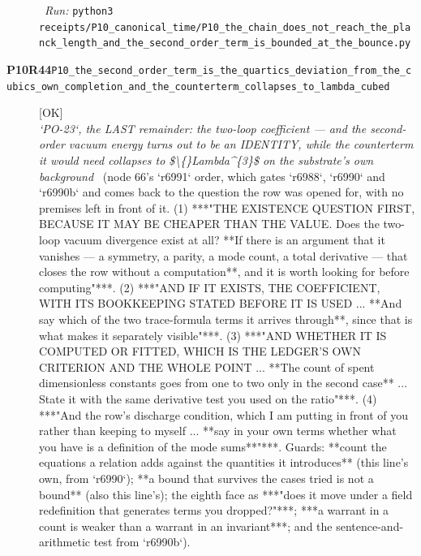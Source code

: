 \begin{description}
\ \emph{Run:} \texttt{python3 receipts/P10\_canonical\_time/P10\_the\_chain\_does\_not\_reach\_the\_planck\_length\_and\_the\_second\_order\_term\_is\_bounded\_at\_the\_bounce.py}
\item[\rcptlabel{P10_the_second_order_term_is_the_quartics_deviation_from_the_cubics_own_completion_and_the_counterterm_collapses_to_lambda_cubed}{P10R44}\textbf{P10R44}\quad\texttt{P10\_the\_second\_order\_term\_is\_the\_quartics\_deviation\_from\_the\_cubics\_own\_completion\_and\_the\_counterterm\_collapses\_to\_lambda\_cubed}]\hfill\textsf{[OK]}\\
\textit{`PO-23`, the LAST remainder: the two-loop coefficient --- and the second-order vacuum energy turns out to be an IDENTITY, while the counterterm it would need collapses to \$\textbackslash\{\}Lambda\textasciicircum{}\{3\}\$ on the substrate's own background} \ (node 66's `r6991` order, which gates `r6988`, `r6990` and `r6990b` and comes back to the question the row was opened for, with no premises left in front of it. (1) ***"THE EXISTENCE QUESTION FIRST, BECAUSE IT MAY BE CHEAPER THAN THE VALUE.  Does the two-loop vacuum divergence exist at all?  **If there is an argument that it vanishes --- a symmetry, a parity, a mode count, a total derivative --- that closes the row without a computation**, and it is worth looking for before computing"***. (2) ***"AND IF IT EXISTS, THE COEFFICIENT, WITH ITS BOOKKEEPING STATED BEFORE IT IS USED ... **And say which of the two trace-formula terms it arrives through**, since that is what makes it separately visible"***. (3) ***"AND WHETHER IT IS COMPUTED OR FITTED, WHICH IS THE LEDGER'S OWN CRITERION AND THE WHOLE POINT ... **The count of spent dimensionless constants goes from one to two only in the second case** ... State it with the same derivative test you used on the ratio"***. (4) ***"And the row's discharge condition, which I am putting in front of you rather than keeping to myself ... **say in your own terms whether what you have is a definition of the mode sums**"***.  Guards: **count the equations a relation adds against the quantities it introduces** (this line's own, from `r6990`); **a bound that survives the cases tried is not a bound** (also this line's); the eighth face as ***"does it move under a field redefinition that generates terms you dropped?"***; ***a warrant in a count is weaker than a warrant in an invariant***; and the sentence-and-arithmetic test from `r6990b`). 

\end{description}
